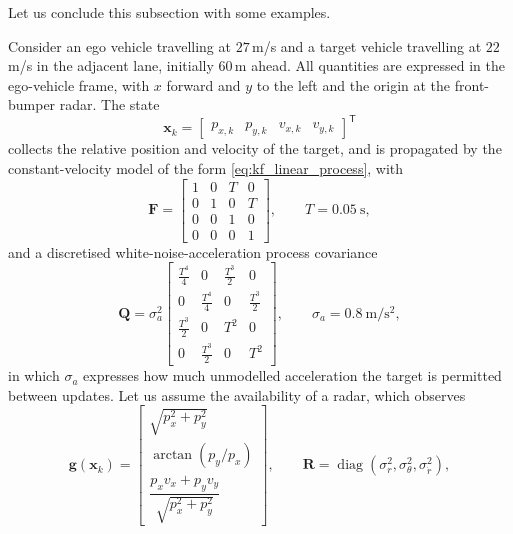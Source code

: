 Let us conclude this subsection with some examples.


\begin{example}
\label{ex:ekf-radar-cutin}
Consider an ego vehicle travelling at $27$\,m/s and a target vehicle travelling
at $22$\,m/s in the adjacent lane, initially $60$\,m ahead. All quantities are
expressed in the ego-vehicle frame, with $x$ forward and $y$ to the left and the
origin at the front-bumper radar. The state
\begin{equation}
\mathbf{x}_k=
\begin{bmatrix}
p_{x,k} & p_{y,k} & v_{x,k} & v_{y,k}
\end{bmatrix}^{\mathsf T}
\end{equation}
collects the relative position and velocity of the target, and is propagated by
the constant-velocity model of the form
\eqref{eq:kf_linear_process}, with
\begin{equation}
\mathbf{F}=
\begin{bmatrix}
1&0&T&0\\
0&1&0&T\\
0&0&1&0\\
0&0&0&1
\end{bmatrix},
\qquad T=0.05\ \mathrm{s},
\end{equation}
and a discretised white-noise-acceleration process covariance
\begin{equation}
\mathbf{Q}=\sigma_a^{2}
\begin{bmatrix}
\tfrac{T^{4}}{4}&0&\tfrac{T^{3}}{2}&0\\[2pt]
0&\tfrac{T^{4}}{4}&0&\tfrac{T^{3}}{2}\\[2pt]
\tfrac{T^{3}}{2}&0&T^{2}&0\\[2pt]
0&\tfrac{T^{3}}{2}&0&T^{2}
\end{bmatrix},
\qquad \sigma_a=0.8\ \mathrm{m/s^{2}},
\end{equation}
in which $\sigma_a$ expresses how much unmodelled acceleration the target is
permitted between updates. 
Let us assume the availability of a radar, which observes
\begin{equation}
\mathbf{g}(\mathbf{x}_k)=
\begin{bmatrix}
\sqrt{p_x^{2}+p_y^{2}}\\[4pt]
\arctan\!\left(p_y/p_x\right)\\[4pt]
\dfrac{p_xv_x+p_yv_y}{\sqrt{p_x^{2}+p_y^{2}}}
\end{bmatrix},
\qquad
\mathbf{R}=\operatorname{diag}\!\left(\sigma_r^{2},\sigma_\theta^{2},\sigma_{\dot r}^{2}\right),
\label{eq:ekf-radar-meas}

\end{equation}
\end{example}
